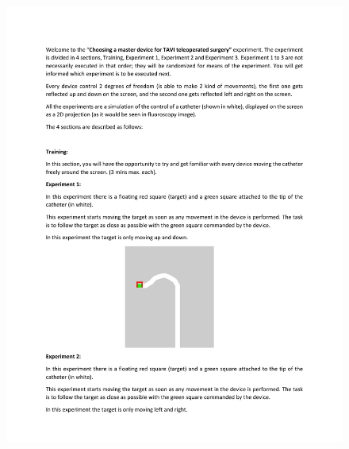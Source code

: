   \begin{figure}
    \centering
    \includegraphics[page={3}, width=1.0\linewidth ]{img/InstructionsQuestionary.pdf}
  \end{figure}

 \cleardoublepage
